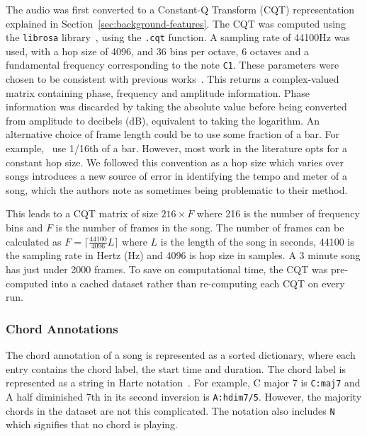 The audio was first converted to a Constant-Q Transform (CQT) representation explained in Section~\ref{sec:background-features}. The CQT was computed using the \texttt{librosa} library~\citep{librosa}, using the \texttt{.cqt} function. A sampling rate of 44100Hz was used, with a hop size of 4096, and 36 bins per octave, 6 octaves and a fundamental frequency corresponding to the note \texttt{C1}. These parameters were chosen to be consistent with previous works~\citep{StructuredTraining}. This returns a complex-valued matrix containing phase, frequency and amplitude information. Phase information was discarded by taking the absolute value before being converted from amplitude to decibels (dB), equivalent to taking the logarithm. An alternative choice of frame length could be to use some fraction of a bar. For example,~\citet{MelodyTranscriptionViaGenerativePreTraining} use 1/16th of a bar. However, most work in the literature opts for a constant hop size. We followed this convention as a hop size which varies over songs introduces a new source of error in identifying the tempo and meter of a song, which the authors note as sometimes being problematic to their method.

This leads to a CQT matrix of size $216 \times F$ where 216 is the number of frequency bins and $F$ is the number of frames in the song. The number of frames can be calculated as $F = \lceil \frac{44100}{4096} L  \rceil$ where $L$ is the length of the song in seconds, 44100 is the sampling rate in Hertz (Hz) and 4096 is hop size in samples. A 3 minute song has just under 2000 frames. To save on computational time, the CQT was pre-computed into a cached dataset rather than re-computing each CQT on every run.

\subsubsection{Chord Annotations}\label{sec:chord-annotations}

The chord annotation of a song is represented as a sorted dictionary, where each entry contains the chord label, the start time and duration. The chord label is represented as a string in Harte notation~\citep{HarteNotation}. For example, C major 7 is \texttt{C:maj7} and A half diminished 7th in its second inversion is \texttt{A:hdim7/5}. However, the majority chords in the dataset are not this complicated. The notation also includes \texttt{N} which signifies that no chord is playing. 

